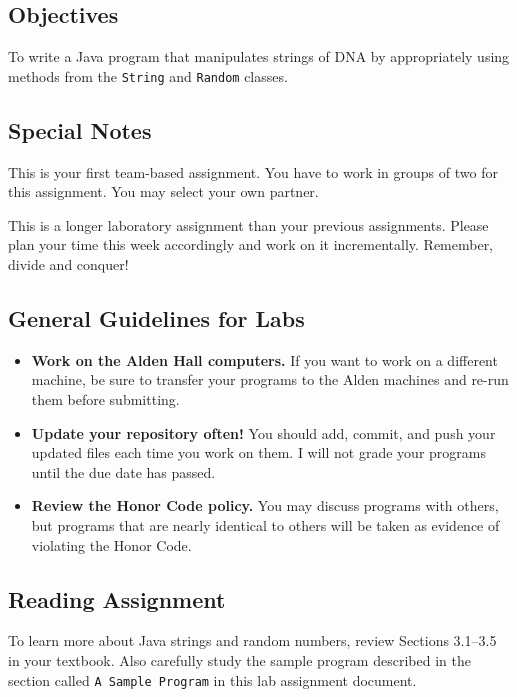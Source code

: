 


\subsection*{Objectives}
\vspace{-0.05in}
To write a Java program that manipulates strings of DNA by appropriately using methods from the {\tt String} and {\tt Random} classes. 

\vspace{-0.05in}
\subsection*{Special Notes}
\vspace{-0.05in}
This is your first team-based assignment. You have to work in groups of two for this assignment. You may select your own partner. 

\noindent This is a longer laboratory assignment than your previous assignments. Please plan your time this week accordingly and work on it incrementally. Remember, divide and conquer! 

\vspace{-0.05in}
\subsection*{General Guidelines for Labs}
\vspace{-0.05in}
\begin{itemize}
\item
{\bf Work on the Alden Hall computers.} If you want to work on a different
machine, be sure to transfer your programs to the Alden
machines and re-run them before submitting.
\item
{\bf Update your repository often!} You should add, commit, 
and push your updated files each time you work on them.  I will not grade 
your programs until the due date has passed.
\item
{\bf Review the Honor Code policy.} You
may discuss programs with others, but programs that are nearly identical
to others will be taken as evidence of violating the Honor Code.
\end{itemize}

\vspace{-0.05in}
\subsection*{Reading Assignment}
\vspace{-0.05in}
To learn more about Java strings and random numbers, review Sections 3.1--3.5 in your textbook. Also carefully study the sample program 
described in the section called {\tt A Sample Program} in this lab assignment document.

